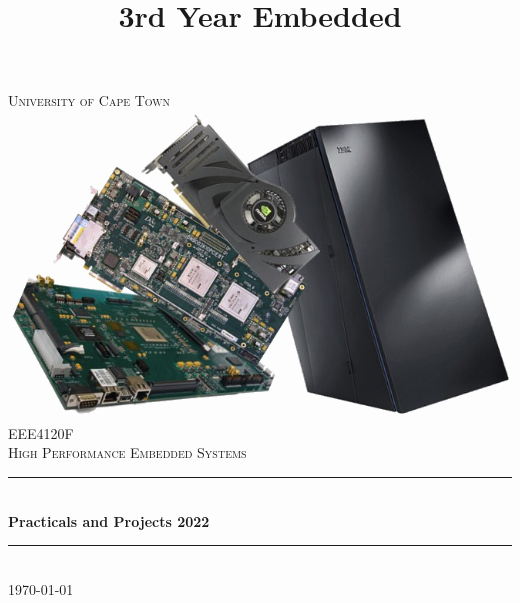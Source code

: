 \title{3rd Year Embedded}

\begin{titlepage}
	\centering
	\vspace*{0.5 cm}
	
	\textsc{\LARGE University of Cape Town}\\[2.0 cm]	%
	\includegraphics[scale = 0.5]{Figures/EEE4048F.png}\\[1 cm]	%
	\textsc{\Large EEE4120F}\\[0.5 cm]				%
	\textsc{\large High Performance Embedded Systems}\\[0.5 cm]				%
	\rule{\linewidth}{0.2 mm} \\[0.4 cm]
	{ \huge \bfseries Practicals and Projects 2022}\\
	\rule{\linewidth}{0.2 mm} \\[1.5 cm]
		\vfill
	{\large \today}\\[2 cm]
	

	
\end{titlepage}